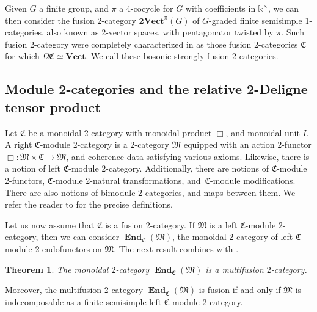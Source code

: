 \documentclass[11pt]{article}
\numberwithin{equation}{section}
\newtheorem{Theorem}{Theorem}[section]
\numberwithin{equation}{section}
\begin{document}
\begin{Example}
Given $G$ a finite group, and $\pi$ a 4-cocycle for $G$ with coefficients in $\mathds{k}^{\times}$, we can then consider the fusion 2-category $\mathbf{2Vect}^{\pi}(G)$ of $G$-graded finite semisimple 1-categories, also known as 2-vector spaces, with pentagonator twisted by $\pi$. Such fusion 2-category were completely characterized in \cite{JFY} as those fusion 2-categories $\mathfrak{C}$ for which $\Omega\mathfrak{C}\simeq \mathbf{Vect}$. We call these bosonic strongly fusion 2-categories.
\end{Example}

\subsection{Module 2-categories and the relative 2-Deligne tensor product}

Let $\mathfrak{C}$ be a monoidal 2-category with monoidal product $\Box$, and monoidal unit $I$. A right $\mathfrak{C}$-module 2-category is a 2-category $\mathfrak{M}$ equipped with an action 2-functor $\Box\colon\mathfrak{M}\times\mathfrak{C}\rightarrow \mathfrak{M}$, and coherence data satisfying various axioms. Likewise, there is a notion of left $\mathfrak{C}$-module 2-category. Additionally, there are notions of $\mathfrak{C}$-module 2-functors, $\mathfrak{C}$-module 2-natural transformations, and~$\mathfrak{C}$-module modifications. There are also notions of bimodule 2-categories, and maps between them. We refer the reader to \cite[Section~2]{D4} for the precise definitions.

Let us now assume that $\mathfrak{C}$ is a fusion 2-category. If $\mathfrak{M}$ is a left $\mathfrak{C}$-module 2-category, then we can consider $\mathbf{\operatorname{End}}_{\mathfrak{C}}(\mathfrak{M})$, the monoidal 2-category of left $\mathfrak{C}$-module 2-endofunctors on $\mathfrak{M}$. The next result combines \cite[Theorem~5.3.2]{D8} with \cite[Corollary~5.1.3]{D9}.

\begin{Theorem}\label{thm:Moritadual}
The monoidal $2$-category $\mathbf{\operatorname{End}}_{\mathfrak{C}}(\mathfrak{M})$ is a multifusion $2$-category.
\end{Theorem}

Moreover, the multifusion 2-category $\mathbf{\operatorname{End}}_{\mathfrak{C}}(\mathfrak{M})$ is fusion if and only if $\mathfrak{M}$ is indecomposable as a finite semisimple left $\mathfrak{C}$-module 2-category.
\end{document}
